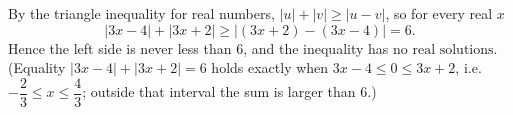 By the triangle inequality for real numbers, $|u|+|v|\ge|u-v|$, so for every real $x$
\[
|3x-4|+|3x+2|\ge\bigl|(3x+2)-(3x-4)\bigr|=6 .
\]
Hence the left side is never less than $6$, and the inequality has $\boxed{\text{no real solutions}}$. (Equality $|3x-4|+|3x+2|=6$ holds exactly when $3x-4\le0\le3x+2$, i.e. $-\dfrac{2}{3}\le x\le\dfrac{4}{3}$; outside that interval the sum is larger than $6$.)
